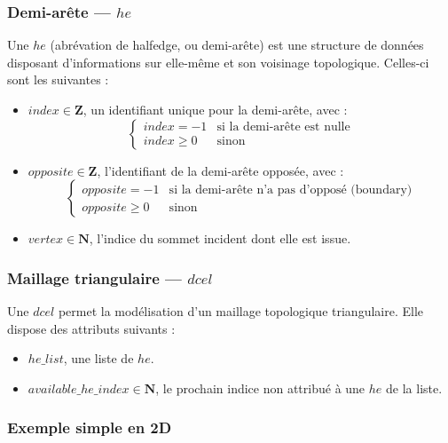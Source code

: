 \documentclass[]{article}
\begin{document}
\subsubsection{Demi-arête — $he$}
Une $he$ (abrévation de halfedge, ou demi-arête) est une structure de données disposant d'informations sur elle-même et son voisinage topologique. Celles-ci sont les suivantes :
\begin{itemize}
	\item $index \in \mathbf{Z}$, un identifiant unique pour la demi-arête, avec :
		\[
			\left\{
				\begin{array}{ll}
					index = -1		& \mbox{si la demi-arête est nulle} \\
					index \geq 0 	& \mbox{sinon}
				\end{array}
			\right.
		\]
	\item $opposite \in \mathbf{Z}$, l'identifiant de la demi-arête opposée, avec :
		\[
			\left\{
				\begin{array}{ll}
					opposite = -1 		& \mbox{si la demi-arête n'a pas d'opposé (boundary)} \\
					opposite \geq 0 	& \mbox{sinon}
				\end{array}
			\right.
		\]
	\item $vertex \in \mathbf{N}$, l'indice du sommet incident dont elle est issue.
\end{itemize}

\subsubsection{Maillage triangulaire — $dcel$}
Une $dcel$ permet la modélisation d'un maillage topologique triangulaire. Elle dispose des attributs suivants :
\begin{itemize}
	\item $he\_list$, une liste de $he$.
	\item $available\_he\_index \in \mathbf{N}$, le prochain indice non attribué à une $he$ de la liste.
\end{itemize}

\subsubsection{Exemple simple en 2D}
\end{document}
